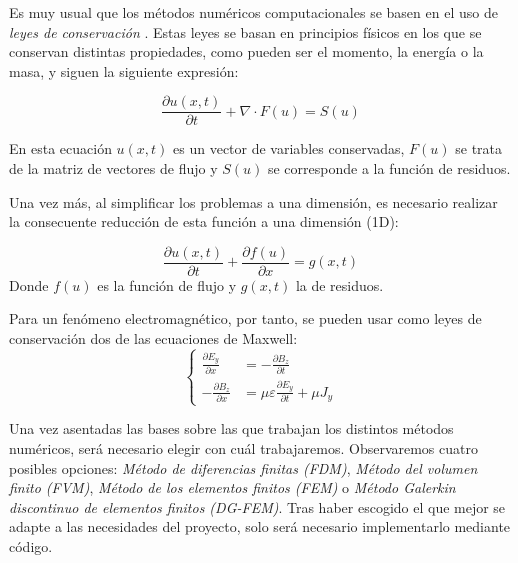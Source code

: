 \documentclass[11pt,a4paper,twoside,pdf]{article}
\numberwithin{equation}{section}
\begin{document}
Es muy usual que los métodos numéricos computacionales se basen en el uso de \textit{leyes de conservación} \cite{conservation}. Estas leyes se basan en principios físicos en los que se conservan distintas propiedades, como pueden ser el momento, la energía o la masa, y siguen la siguiente expresión: 

\begin{equation}
    \frac{\partial u(x,t)}{\partial t} + \nabla\cdot F(u)=S(u)
\end{equation}

En esta ecuación $u(x,t)$ es un vector de variables conservadas, $F(u)$ se trata de la matriz de vectores de flujo y $S(u)$ se corresponde a la función de residuos.

Una vez más, al simplificar los problemas a una dimensión, es necesario realizar la consecuente reducción de esta función a una dimensión (1D):

\begin{equation}
    \frac{\partial u(x,t)}{\partial t}+\frac{\partial f(u)}{\partial x}=g(x,t) \label{eqCL}
\end{equation}
Donde $f(u)$ es la función de flujo y $g(x,t)$ la de residuos.

Para un fenómeno electromagnético, por tanto, se pueden usar como leyes de conservación dos de las ecuaciones de Maxwell:
\begin{equation}
\left\{
\begin{aligned}
\frac{\partial E_y}{\partial x} &= -\frac{\partial B_z}{\partial t} \\[10pt]
-\frac{\partial B_z}{\partial x} &= \mu \varepsilon \frac{\partial E_y}{\partial t} + \mu J_y
\end{aligned}
\right.
\label{eq:maxwell}
\end{equation}

Una vez asentadas las bases sobre las que trabajan los distintos métodos numéricos, será necesario elegir con cuál trabajaremos. Observaremos cuatro posibles opciones: \textit{Método de diferencias finitas (FDM)}, \textit{Método del volumen finito (FVM)}, \textit{Método de los elementos finitos (FEM)} o \textit{Método Galerkin discontinuo de elementos finitos (DG-FEM)}. Tras haber escogido el que mejor se adapte a las necesidades del proyecto, solo será necesario implementarlo mediante código.
\newpage
\end{document}
